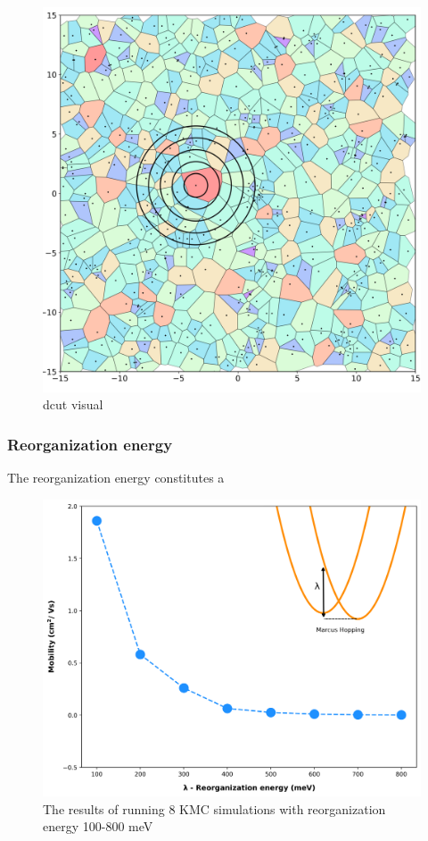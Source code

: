 \begin{figure}
  \center
  \includegraphics[width=\linewidth, height=\textheight,keepaspectratio]{figures/crystalline_voronoi_d_cut_circles.png} 
  \caption{dcut visual}
  \label{fig:dcut}
\end{figure}
\subsubsection{Reorganization energy}
The reorganization energy constitutes a 
\begin{figure}
  \center
  \includegraphics[width=\linewidth, height=\textheight,keepaspectratio]{figures/reorg.png} 
    \caption{The results of running 8 KMC simulations with reorganization energy 100-800 meV}
  \label{fig:reorg}
\end{figure}

